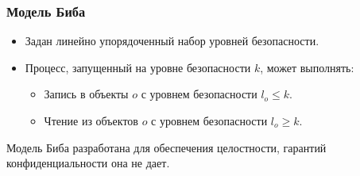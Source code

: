 \begin{frame}
    \frametitle{Модель Биба}
    
    \begin{itemize}
        \item Задан линейно упорядоченный набор уровней безопасности.
        \item Процесс, запущенный на уровне безопасности $k$, может выполнять:
        \begin{itemize}
            \item Запись в объекты $o$ с уровнем безопасности $l_o\leq k$.
            \item Чтение из объектов $o$ с уровнем безопасности $l_o\geq k$.
        \end{itemize}
    \end{itemize}
    
    Модель Биба разработана для обеспечения \alert{целостности}, гарантий \alert{конфиденциальности} она не дает.
\end{frame}


